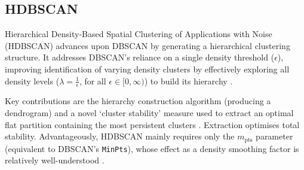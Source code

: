 \documentclass[10pt,oneside]{report}
\renewcommand{\citet}[1]{\citeauthor{#1}, \citeyear{#1}}
\begin{document}
\subsection{HDBSCAN}\label{sec:hdbscan}


Hierarchical Density-Based Spatial Clustering of Applications with Noise (HDBSCAN) \cite{campello2013density} advances upon DBSCAN by generating a hierarchical clustering structure. It addresses DBSCAN's reliance on a single density threshold ($\epsilon$), improving identification of varying density clusters by effectively exploring all density levels ($\lambda = \frac 1 \epsilon$, for all $\epsilon \in \big[0, \infty \big)$) to build its hierarchy \cite{campello2013density}.


Key contributions are the hierarchy construction algorithm (producing a dendrogram) and a novel `cluster stability' measure used to extract an optimal flat partition containing the most persistent clusters \cite{campello2013density}. Extraction optimises total stability. Advantageously, HDBSCAN mainly requires only the $m_{\text{pts}}$ parameter (equivalent to DBSCAN's \texttt{MinPts}), whose effect as a density smoothing factor is relatively well-understood \cite{campello2013density}.
\end{document}
